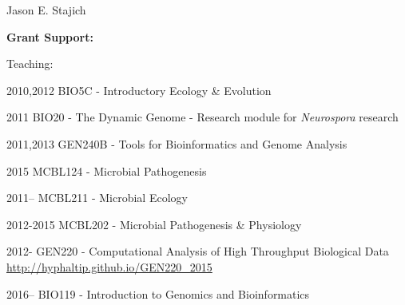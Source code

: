 \documentclass[10pt]{article}
\begin{document}
\begin{cv}{\centerline{Jason E. Stajich}}
\begin{cvlistcompact}{\bf Grant Support:}
\begin{cvlistcompact}{Teaching:}

\item [2010,2012] BIO5C - Introductory Ecology \& Evolution 
\item [2011] BIO20 - The Dynamic Genome - Research module for \textit{Neurospora} research
\item [2011,2013] GEN240B - Tools for Bioinformatics and Genome Analysis
\item [2015] MCBL124 - Microbial Pathogenesis
\item [2011--] MCBL211 - Microbial Ecology
\item [2012-2015] MCBL202 - Microbial Pathogenesis \& Physiology
\item [2012-] GEN220 - Computational Analysis of High Throughput Biological Data \url{http://hyphaltip.github.io/GEN220_2015}
\item [2016--] BIO119 - Introduction to Genomics and Bioinformatics

\end{cvlistcompact}


\end{cvlistcompact}
\end{cv}
\end{document}
